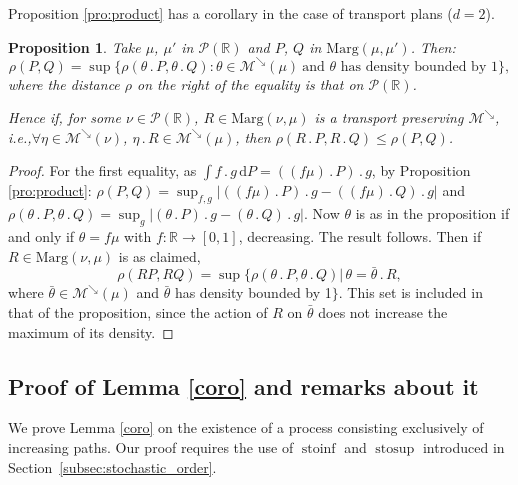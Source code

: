 \documentclass[11pt]{article}
\newcommand{\ie}{i.e.,\xspace}
\newcommand{\ldot}{\mathbin{.}}
\theoremstyle{plain}
\newtheorem{pro}[them]{Proposition}
\theoremstyle{definition}
\newcommand{\dd}{\mathrm{d}}
\newcommand{\p}{\mathcal{P}}
\newcommand{\ma}{\mathrm{Marg}}
\newcommand{\R}{\mathbb{R}}
\newcommand{\stosup}{\operatorname{stosup}}
\newcommand{\stoinf}{\operatorname{stoinf}}
\newcommand{\mdec}{\mathcal{M}^{\scriptscriptstyle\searrow}}
\begin{document}
Proposition \ref{pro:product} has a corollary in the case of transport plans ($d=2$).
\begin{pro}\label{pro:multiplicationcontractante}Take $\mu$, $\mu'$ in $\p(\R)$ and $P$, $Q$ in $\ma(\mu,\mu')$. Then:
\[\rho(P,Q)=\sup\{\rho(\theta\ldot P, \theta \ldot Q):\theta\in\mdec(\mu)\ \text{and $\theta$ has density bounded by $1$}\},\]
where the distance $\rho$ on the right of the equality is that on $\p(\R)$.

Hence if, for some $\nu\in \p(\R)$, $R\in\ma(\nu,\mu)$ is a transport preserving $\mdec$, \ie $\forall\eta\in\mdec(\nu)$, $\eta\ldot R\in\mdec(\mu)$, then $\rho(R\ldot P,R\ldot Q)\leqslant\rho(P,Q)$.
\end{pro}

\begin{proof}
For the first equality, as $\int f\ldot g\, \dd P=((f\mu)\ldot P)\ldot g$, by Proposition \ref{pro:product}: $\rho(P,Q)=\sup_{f,g} |((f\mu)\ldot P)\ldot g-((f\mu)\ldot Q)\ldot g|$ and $\rho(\theta\ldot P, \theta \ldot Q)=\sup_g |(\theta\ldot P)\ldot g-(\theta\ldot Q)\ldot g|$. Now $\theta$ is as in the proposition if and only if $\theta=f\mu$ with $f:\R\to[0,1]$, decreasing. The result follows. Then if $R\in\ma(\nu,\mu)$ is as claimed,
\[
\rho(RP,RQ)=\sup\{\rho(\theta\ldot P, \theta \ldot Q)|\,\theta=\bar\theta\ldot R,
\]
where $\bar\theta\in\mdec(\mu)$ and $\bar\theta$ has density bounded by 1$\}$. This set is included in that of the proposition, since the action of $R$ on $\bar\theta$ does not increase the maximum of its density.
\end{proof}

\subsection{Proof of Lemma \ref{coro} and remarks about it}\label{subsec:proof_coro}

We prove Lemma \ref{coro} on the existence of a process consisting exclusively of increasing paths. Our proof requires the use of $\stoinf$ and $\stosup$ introduced in Section~\ref{subsec:stochastic_order}.
\end{document}
